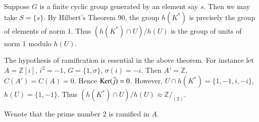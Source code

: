 \begin{rem}\label{chap3:rem2} %
Suppose $G$ is a finite cyclic group generated by an element say
$s$. Then we may take $S = \{s \}$. By Hilbert's Theorem 90, the
group $h(K^*)$ is precisely the group of elements of norm 1. Thus
$(h(K^*) \cap U) / h(U)$ is the group of units of norm 1 modulo
$h(U)$. 
 \end{rem}  
      
 \begin{rem} %
The hypothesis of ramification is essential in the above theorem. For
instance let $A = \mathbb{Z} [i]$,  $i^2 = -1$, $G = \{1, \sigma\}$,
$\sigma (i) = - i$. Then $A' = \mathbb{Z}$, $C(A') = C(A) = 0$. Hence
$\operatorname{Ker} (\bar{j}) = 0$. However, $U \cap h(K^*) = \{1, -1, i, -i\}$, $h(U)
= \{1, -1\}$. Thus $(h(K^*) \cap U) \big/ h(U) \approx \mathbb{Z}
/_{(2)}$.  
 \end{rem}    
    
\noindent
We\pageoriginale note that the prime number 2 is ramified in $A$. 
   

